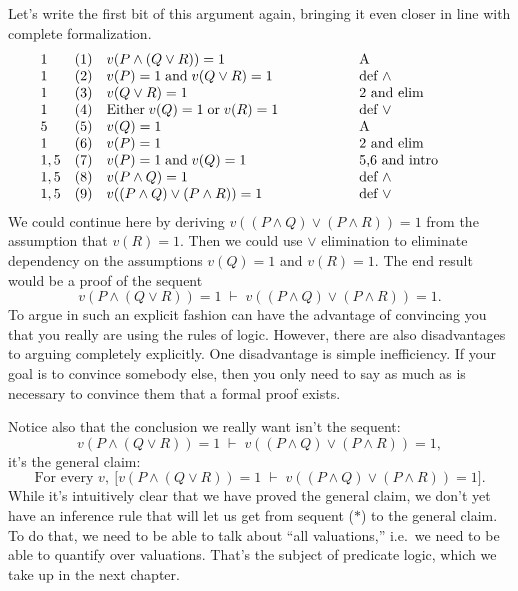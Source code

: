 Let's write the first bit of this argument again, bringing it even
closer in line with complete formalization.
\[ \begin{array}{l l >{$}p{6cm}<{$} p{3cm}}
     1 & (1) & v(P\wedge (Q\vee R))=1 & A \\
     1 & (2) & v(P)=1 \;\text{and}\; v(Q\vee R)=1 & def $\wedge$ \\
     1 & (3) & v(Q\vee R)=1 & 2 and elim \\
     1 & (4) & \text{Either}\;v(Q)=1\;\text{or}\;v(R)=1 & def $\vee$
     \\
     5 & (5) & v(Q)=1 & A \\
     1 & (6) & v(P)=1 & 2 and elim \\
     1,5 & (7) & v(P)=1\;\text{and}\;v(Q)=1 & 5,6 and intro \\
     1,5 & (8) & v(P\wedge Q)=1 & def $\wedge$  \\
     1,5 & (9) & v((P\wedge Q)\vee (P\wedge R))=1 & def $\vee$ 
               \end{array} \]
We could continue here by deriving $v((P\wedge Q)\vee (P\wedge R))=1$
from the assumption that $v(R)=1$.  Then we could use $\vee$
elimination to eliminate dependency on the assumptions $v(Q)=1$ and
$v(R)=1$.  The end result would be a proof of the sequent
\[ v(P\wedge (Q\vee R))=1 \;\vdash\; v((P\wedge Q)\vee (P\wedge R))=1 .\]
To argue in such an explicit fashion can have the advantage of
convincing you that you really are using the rules of logic.  However,
there are also disadvantages to arguing completely explicitly.  One
disadvantage is simple inefficiency.  If your goal is to convince
somebody else, then you only need to say as much as is necessary to
convince them that a formal proof exists.

Notice also that the conclusion we really want isn't the
sequent:
\begin{equation} v(P\wedge (Q\vee R))=1 \; \vdash \; v((P\wedge Q)\vee (P\wedge
  R))=1 , \tag{$\ast$} \end{equation} 
it's the general claim:
\[ \text{For every $v$},\:\bigl[ v(P\wedge (Q\vee R))=1 \; \vdash \;
  v((P\wedge Q)\vee (P\wedge R))=1 \bigr] .\] While it's intuitively
clear that we have proved the general claim, we don't yet have an
inference rule that will let us get from sequent ($\ast$) to the
general claim.  To do that, we need to be able to talk about ``all
valuations,'' i.e.\ we need to be able to quantify over valuations.
That's the subject of predicate logic, which we take up in the next
chapter.
                                     

